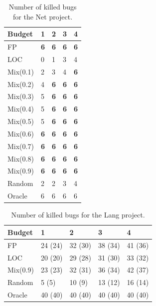 \begin{}
\begin{table}[]
\begin{tabular}{lllll}
Budget   & 1         & 2         & 3         & 4         \\ \midrule
FP       & \textbf{6}&\textbf{6}      &\textbf{6}      & \textbf{6}      \\
LOC      & 0      & 1      & 3      & 4      \\
Mix(0.1) & 2      & 3      & 4      &\textbf{6}      \\
Mix(0.2) & 4      &\textbf{6}      &\textbf{6}      &\textbf{6}      \\
Mix(0.3) & 5      &\textbf{6}      &\textbf{6}      &\textbf{6}      \\
Mix(0.4) & 5      &\textbf{6}      &\textbf{6}      &\textbf{6}      \\
Mix(0.5) & 5      &\textbf{6}      &\textbf{6}      &\textbf{6}      \\
Mix(0.6) & \textbf{6}&\textbf{6}      &\textbf{6}     &\textbf{6}      \\
Mix(0.7) & \textbf{6}&\textbf{6}      &\textbf{6}      &\textbf{6}      \\
Mix(0.8) & \textbf{6}&\textbf{6}      &\textbf{6}      &\textbf{6}      \\
Mix(0.9) & \textbf{6}&\textbf{6}      &\textbf{6}     &\textbf{6}      \\
Random   & 2      & 2      & 3      & 4      \\ \midrule
Oracle   & 6      & 6      & 6      & 6     \\\bottomrule
\end{tabular}
\caption{Number of killed bugs for the Net project.}
\label{tab:net}
\end{table}

\begin{table}[]
\begin{tabular}{lllll}
Budget   & 1           & 2           & 3           & 4           \\\midrule
FP       & 24     (24) & 32     (30) & 38     (34) & 41     (36) \\
LOC      & 20     (20) & 29     (28) & 31     (30) & 33     (32) \\
Mix(0.9) & 23     (23) & 32     (31) & 36     (34) & 42     (37) \\
Random   & 5      (5)  & 10     (9)  & 13     (12) & 16     (14) \\\midrule
Oracle   & 40     (40) & 40     (40) & 40     (40) & 40     (40)\\\bottomrule
\end{tabular}
\caption{Number of killed bugs for the Lang project.}
\label{tab:lang2}
\end{table}





\end{}
